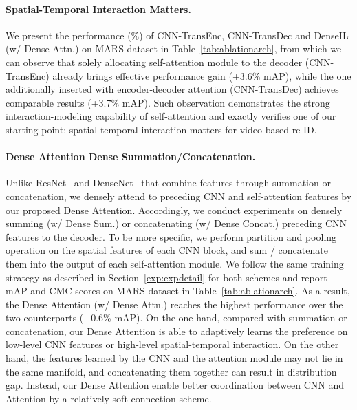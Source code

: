 \documentclass[10pt,twocolumn,letterpaper]{article}
\begin{document}
\paragraph{Spatial-Temporal Interaction Matters.}
We present the performance (\%) of CNN-TransEnc, CNN-TransDec and DenseIL (w/ Dense Attn.) on MARS dataset in Table~\ref{tab:ablationarch}, from which we can observe that solely allocating self-attention module to the decoder (CNN-TransEnc) already brings effective performance gain (+3.6\% mAP), while the one additionally inserted with encoder-decoder attention (CNN-TransDec) achieves comparable results (+3.7\% mAP). Such observation demonstrates the strong interaction-modeling capability of self-attention and exactly verifies one of our starting point: spatial-temporal interaction matters for video-based re-ID.

\vspace{-2.5mm}
\paragraph{Dense Attention \vs Dense Summation/Concatenation.}
Unlike ResNet~\cite{he2016deep} and DenseNet~\cite{huang2017densely} that combine features through summation or concatenation, we densely attend to preceding CNN and self-attention features by our proposed Dense Attention. Accordingly, we conduct experiments on densely summing (w/ Dense Sum.) or concatenating (w/ Dense Concat.) preceding CNN features to the decoder. To be more specific, we perform partition and pooling operation on the spatial features of each CNN block, and sum / concatenate them into the output of each self-attention module. We follow the same training strategy as described in Section~\ref{exp:expdetail} for both schemes and report mAP and CMC scores on MARS dataset in Table~\ref{tab:ablationarch}. As a result, the Dense Attention (w/ Dense Attn.) reaches the highest performance over the two counterparts (+0.6\% mAP). On the one hand, compared with summation or concatenation, our Dense Attention is able to adaptively learns the preference on low-level CNN features or high-level spatial-temporal interaction. On the other hand, the features learned by the CNN and the attention module may not lie in the same manifold, and concatenating them together can result in distribution gap. Instead, our Dense Attention enable better coordination between CNN and Attention by a relatively soft connection scheme.

\vspace{-2.5mm}
\end{document}
